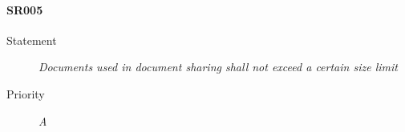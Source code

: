 \paragraph{SR005}
  \begin{description}
  \item [Statement] 
    \textit{ Documents used in document sharing shall not exceed a certain size limit}
  \item [Priority] \textit{A}
\end{description}
